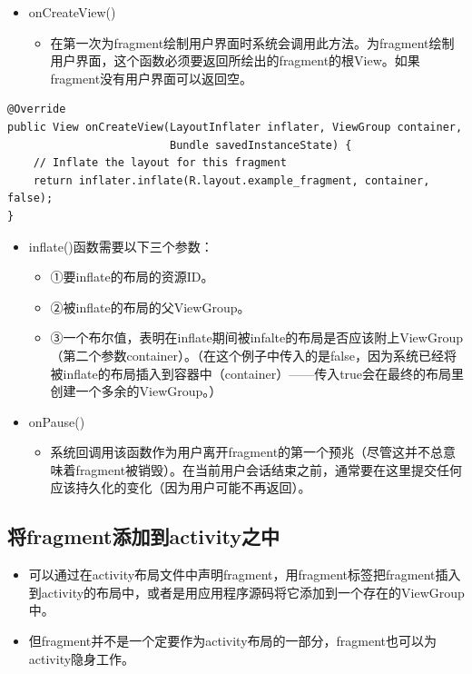 \documentclass[9pt, b5paper]{article}
\begin{document}
\begin{itemize}
\begin{itemize}
\begin{itemize}
\end{itemize}
\item onCreateView()
\begin{itemize}
\item 在第一次为fragment绘制用户界面时系统会调用此方法。为fragment绘制用户界面，这个函数必须要返回所绘出的fragment的根View。如果fragment没有用户界面可以返回空。
\end{itemize}
\end{itemize}
\begin{verbatim}
@Override
public View onCreateView(LayoutInflater inflater, ViewGroup container,
                         Bundle savedInstanceState) {　
    // Inflate the layout for this fragment
    return inflater.inflate(R.layout.example_fragment, container, false);
}
\end{verbatim}
\begin{itemize}
\item inflate()函数需要以下三个参数：
\begin{itemize}
\item ①要inflate的布局的资源ID。　
\item ②被inflate的布局的父ViewGroup。
\item ③一个布尔值，表明在inflate期间被infalte的布局是否应该附上ViewGroup（第二个参数container）。（在这个例子中传入的是false，因为系统已经将被inflate的布局插入到容器中（container）——传入true会在最终的布局里创建一个多余的ViewGroup。）　
\end{itemize}
\item onPause()
\begin{itemize}
\item 系统回调用该函数作为用户离开fragment的第一个预兆（尽管这并不总意味着fragment被销毁）。在当前用户会话结束之前，通常要在这里提交任何应该持久化的变化（因为用户可能不再返回）。
\end{itemize}
\end{itemize}
\end{itemize}

\subsection{将fragment添加到activity之中}
\label{sec-2-3}
\begin{itemize}
\item 可以通过在activity布局文件中声明fragment，用fragment标签把fragment插入到activity的布局中，或者是用应用程序源码将它添加到一个存在的ViewGroup中。　
\item 但fragment并不是一个定要作为activity布局的一部分，fragment也可以为activity隐身工作。
\end{itemize}
\end{document}

